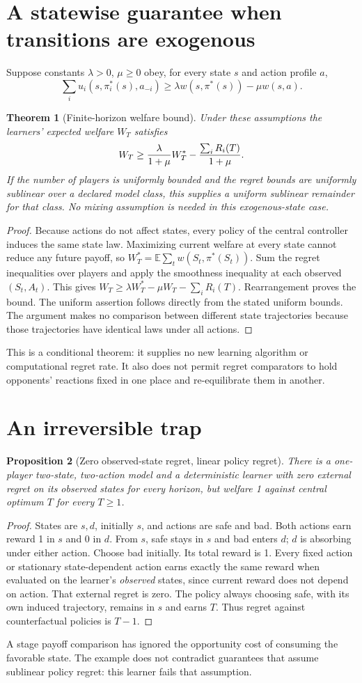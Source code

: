 \documentclass[11pt,a4paper]{article}
\newtheorem{theorem}{Theorem}[section]
\newtheorem{proposition}[theorem]{Proposition}
\theoremstyle{definition}
\theoremstyle{remark}
\newcommand{\E}{\mathbb{E}}
\begin{document}
\section{A statewise guarantee when transitions are exogenous}
Suppose constants $\lambda>0$, $\mu\ge0$ obey, for every state $s$ and action profile $a$,
\[
 \sum_i u_i(s,\pi_i^*(s),a_{-i})
      \ge\lambda w(s,\pi^*(s))-\mu w(s,a).
\]
\begin{theorem}[Finite-horizon welfare bound]
Under these assumptions the learners' expected welfare $W_T$ satisfies
\[
 W_T\ge {\lambda\over1+\mu}W_T^*
                 -{\sum_iR_i(T)\over1+\mu}.
\]
If the number of players is uniformly bounded and the regret bounds are uniformly sublinear over a declared model class, this supplies a uniform sublinear remainder for that class. No mixing assumption is needed in this exogenous-state case.
\end{theorem}
\begin{proof}
Because actions do not affect states, every policy of the central controller induces the same state law. Maximizing current welfare at every state cannot reduce any future payoff, so
$W_T^*=\E\sum_t w(S_t,\pi^*(S_t))$.
Sum the regret inequalities over players and apply the smoothness inequality at each observed $(S_t,A_t)$. This gives
$W_T\ge\lambda W_T^*-\mu W_T-\sum_iR_i(T)$.
Rearrangement proves the bound. The uniform assertion follows directly from the stated uniform bounds. The argument makes no comparison between different state trajectories because those trajectories have identical laws under all actions.
\end{proof}
This is a conditional theorem: it supplies no new learning algorithm or computational regret rate. It also does not permit regret comparators to hold opponents' reactions fixed in one place and re-equilibrate them in another.
\section{An irreversible trap}
\begin{proposition}[Zero observed-state regret, linear policy regret]
There is a one-player two-state, two-action model and a deterministic learner with zero external regret on its observed states for every horizon, but welfare 1 against central optimum $T$ for every $T\ge1$.
\end{proposition}
\begin{proof}
States are $s,d$, initially $s$, and actions are safe and bad. Both actions earn reward 1 in $s$ and 0 in $d$. From $s$, safe stays in $s$ and bad enters $d$; $d$ is absorbing under either action. Choose bad initially. Its total reward is 1. Every fixed action or stationary state-dependent action earns exactly the same reward when evaluated on the learner's \emph{observed} states, since current reward does not depend on action. That external regret is zero. The policy always choosing safe, with its own induced trajectory, remains in $s$ and earns $T$. Thus regret against counterfactual policies is $T-1$.
\end{proof}
A stage payoff comparison has ignored the opportunity cost of consuming the favorable state. The example does not contradict guarantees that assume sublinear policy regret: this learner fails that assumption.
\end{document}
